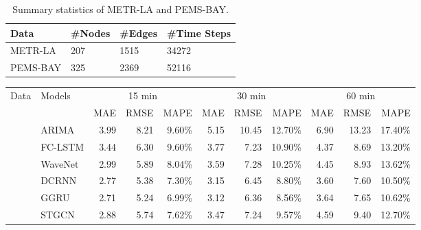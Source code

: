 \begin{table}[tb!]
\centering
\begin{tabular}{llll}
\hline 
Data     & \#Nodes & \#Edges & \#Time Steps \\ \hline
METR-LA  & 207     &   1515      & 34272        \\
PEMS-BAY & 325        &   2369      &     52116 \\   
\hline
\end{tabular}
\caption{Summary statistics of METR-LA and PEMS-BAY.}
\label{table:datastat}
\end{table}


	\begin{table}[tb]
		\centering
		\vskip -0.1in
		\begin{tabular}{l l  r r r | r r r |r r r}
			\toprule
			\multirow{2}{*}{Data} & \multirow{2}{*}{Models}   & \multicolumn{3}{c}{15 min} & \multicolumn{3}{c}{30 min}  & \multicolumn{3}{c}{60 min} \\
			\cline{3-5}  \cline{6-8} \cline{9-11}   
			&& {\small MAE} & {\small RMSE} & {\small MAPE} & {\small MAE} & {\small RMSE} & {\small MAPE} & {\small MAE} & {\small RMSE} & {\small MAPE}\\
			\midrule
			\multirow{6}{*}{\rotatebox[origin=c]{90}{METR-LA}}
			&ARIMA \cite{li2018diffusion} & 3.99 & 8.21 & 9.60\% & 5.15 & 10.45 & 12.70\%& 6.90 & 13.23 & 17.40\% \\
			&FC-LSTM \cite{li2018diffusion} & 3.44 & 6.30 & 9.60\% & 3.77 & 7.23 & 10.90\%& 4.37 & 8.69 & 13.20\% \\
			&WaveNet \cite{oord2016wavenet} & 2.99 & 5.89 & 8.04\% & 3.59 & 7.28 &10.25\%  & 4.45 & 8.93 & 13.62\% \\
			&DCRNN \cite{li2018diffusion} & 2.77 & 5.38 & 7.30\% & 3.15 & 6.45 & 8.80\% & 3.60 & 7.60 & 10.50\% \\ 
			&GGRU \cite{zhang2018gaan}     & 2.71 & 5.24 & 6.99\% & 3.12 & 6.36 & 8.56\% & 3.64 & 7.65 & 10.62\% \\
			&STGCN \cite{yu2018spatio} & 2.88 & 5.74 & 7.62\% & 3.47 & 7.24 & 9.57\% & 4.59 & 9.40 & 12.70\%\\


\end{tabular}
\end{table}

